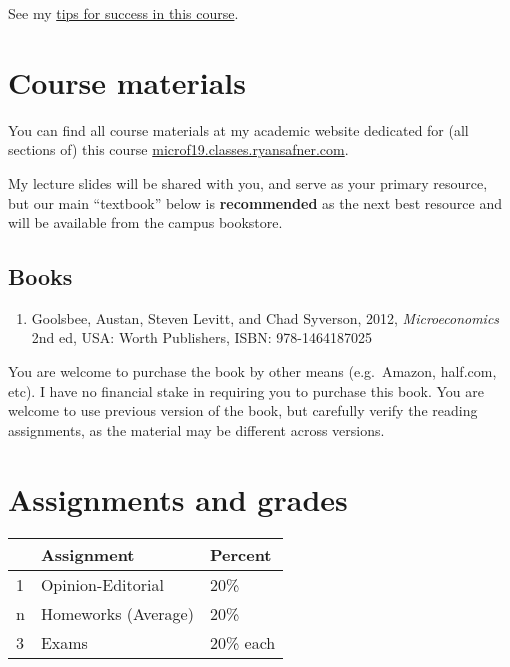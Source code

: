\documentclass{article}
\providecommand{\tightlist}{%
  \setlength{\itemsep}{0pt}\setlength{\parskip}{0pt}}
\begin{document}
See my \href{/reference\#tips}{tips for success in this course}.

\hypertarget{course-materials}{%
\section{Course materials}\label{course-materials}}

You can find all course materials at my academic website dedicated for
(all sections of) this course
\href{http://microf19.classes.ryansafner.com}{microf19.classes.ryansafner.com}.

My lecture slides will be shared with you, and serve as your primary
resource, but our main ``textbook'' below is \textbf{recommended} as the
next best resource and will be available from the campus bookstore.

\hypertarget{books}{%
\subsection{Books}\label{books}}

\begin{enumerate}
\def\labelenumi{\arabic{enumi}.}
\tightlist
\item
  Goolsbee, Austan, Steven Levitt, and Chad Syverson, 2012,
  \emph{Microeconomics} 2nd ed, USA: Worth Publishers, ISBN:
  978-1464187025
\end{enumerate}

You are welcome to purchase the book by other means (e.g.~Amazon,
half.com, etc). I have no financial stake in requiring you to purchase
this book. You are welcome to use previous version of the book, but
carefully verify the reading assignments, as the material may be
different across versions.

\hypertarget{assignments-and-grades}{%
\section{Assignments and grades}\label{assignments-and-grades}}

\begin{center}

\begin{tabular}{lll}
\toprule
 & Assignment & Percent\\
\midrule
1 & Opinion-Editorial & 20\%\\
n & Homeworks (Average) & 20\%\\
3 & Exams & 20\% each\\
\bottomrule
\end{tabular}
\end{center}
\end{document}
